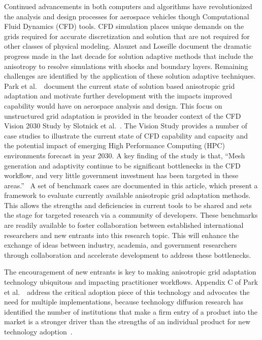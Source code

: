 \documentclass[3p,times,procedia,number]{elsarticle}
\begin{document}
Continued advancements in both computers and algorithms
have revolutionized the analysis and design processes for
aerospace vehicles though Computational Fluid Dynamics (CFD) tools.
CFD simulation places unique demands on the grids required for
accurate discretization and solution that are not required
for other classes of physical modeling.
Alauzet and Loseille \cite{alauzet-loseille-decade-aniso-adapt-cfd}
document the dramatic progress made in the last decade
for solution adaptive methods that include the anisotropy to
resolve simulations with shocks and boundary layers.
Remaining challenges are identified
by the application of these solution adaptive techniques.
Park et al.~\cite{park-unstruct-adapt-status-cfd2030}~document
the current state of solution based anisotropic
grid adaptation and motivate further development with
the impacts improved capability would have on
aerospace analysis and design.
This focus on unstructured grid adaptation
is provided in the broader context of the
CFD Vision 2030 Study by Slotnick et al.~\cite{cfd-vision-2030}.
The Vision Study provides a number of case studies
to illustrate the current state of CFD capability and capacity and the
potential impact of emerging High Performance Computing (HPC)
environments forecast in year 2030.
A key finding of the study is that,
``Mesh generation and adaptivity continue to be significant bottlenecks
in the CFD workflow, and very little government investment has been targeted
in these areas.''~\cite{cfd-vision-2030}
A set of benchmark cases are documented in this article,
which present a framework to evaluate
currently available anisotropic grid adaptation methods.
This allows the strengths and deficiencies in current tools to be shared
and sets the stage for targeted research via a community of developers.
These benchmarks are readily available to foster collaboration
between established international researchers and new
entrants into this research topic.
This will enhance the exchange of ideas between
industry, academia, and government researchers through collaboration
and accelerate development to address these bottlenecks.

The encouragement of new entrants is key to making
anisotropic grid adaptation technology ubiquitous
and impacting practitioner workflows.
Appendix C of Park et al.~\cite{park-unstruct-adapt-status-cfd2030}~address
the critical adoption piece of this technology and
advocates the need for multiple implementations,
because technology diffusion research has identified the
number of institutions that make a firm entry of a product
into the market is a stronger driver than the strengths of an individual
product for new technology
adoption~\cite{agarwal-bayus-market-evo-takeoff-innovation}.
\end{document}
